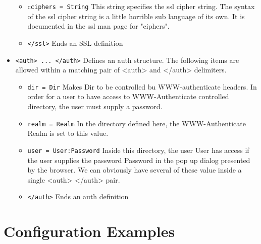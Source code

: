 \documentclass[11pt,oneside,english]{book}
\begin{document}
\begin{itemize}
\begin{itemize}
\item        c\verb+ciphers = String+
              This  string  specifies  the  ssl  cipher
              string.  The syntax of the ssl cipher string
              is a little horrible sub language of its own.
              It  is  documented  in  the ssl man page for
              "ciphers".

\item        \verb+</ssl>+
              Ends an SSL definition
\end{itemize}


\item       \verb+<auth> ... </auth>+
              Defines an  auth  structure.  The  following
              items  are allowed within a matching pair of
              <auth> and </auth> delimiters.

\begin{itemize}

\item       \verb+dir = Dir+
              Makes Dir to be controlled bu  WWW-authenticate
              headers.  In  order for a user to have
              access to WWW-Authenticate controlled  directory,
              the user must supply a password.

\item       \verb+realm = Realm+
              In  the  directory  defined  here,  the WWW-Authenticate
              Realm is set to this value.

\item       \verb+user = User:Password+
              Inside this directory,  the  user  User  has
              access  if  the  user  supplies the password
              Password in the pop up dialog presented  by
              the  browser.  We can obviously have several
              of  these  value  inside  a  single   <auth>
              </auth> pair.

\item       \verb+</auth>+
              Ends an auth definition


\end{itemize}

\end{itemize}







\section{Configuration Examples}
\end{document}
